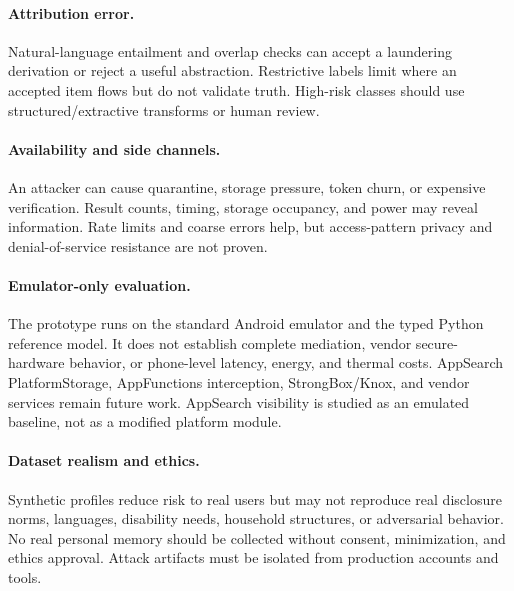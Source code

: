 \paragraph{Attribution error.}
Natural-language entailment and overlap checks can accept a laundering derivation or reject a useful abstraction. Restrictive labels limit where an accepted item flows but do not validate truth. High-risk classes should use structured/extractive transforms or human review.

\paragraph{Availability and side channels.}
An attacker can cause quarantine, storage pressure, token churn, or expensive verification. Result counts, timing, storage occupancy, and power may reveal information. Rate limits and coarse errors help, but access-pattern privacy and denial-of-service resistance are not proven.

\paragraph{Emulator-only evaluation.}
The prototype runs on the standard Android emulator and the typed Python reference model. It does not establish complete mediation, vendor secure-hardware behavior, or phone-level latency, energy, and thermal costs. AppSearch PlatformStorage, AppFunctions interception, StrongBox/Knox, and vendor services remain future work. AppSearch visibility is studied as an emulated baseline, not as a modified platform module.

\paragraph{Dataset realism and ethics.}
Synthetic profiles reduce risk to real users but may not reproduce real disclosure norms, languages, disability needs, household structures, or adversarial behavior. No real personal memory should be collected without consent, minimization, and ethics approval. Attack artifacts must be isolated from production accounts and tools.
